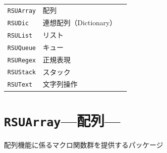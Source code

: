 \section{\DocStrTitlePackageListInCategory}
\begin{center}
\begin{xltabular}{\textwidth}{|p{2truecm}|X|p{2truecm}|}
\hline
\thead{\DocStrHeaderPackageName}&\thead{\DocStrHeaderPackagePurpose}&\thead{\DocStrRefto}\\
\hline
\hline
\texttt{RSUArray}&配列&\\
\hline
\texttt{RSUDic}&連想配列（Dictionary）&\\
\hline
\texttt{RSUList}&リスト&\\
\hline
\texttt{RSUQueue}&キュー&\\
\hline
\texttt{RSURegex}&正規表現&\\
\hline
\texttt{RSUStack}&スタック&\\
\hline
\texttt{RSUText}&文字列操作&\\
\hline
\end{xltabular}
\end{center}
\section{\texttt{RSUArray}\;---\;配列\;---}\label{sec:RSUArray}
配列機能に係るマクロ関数群を提供するパッケージ
